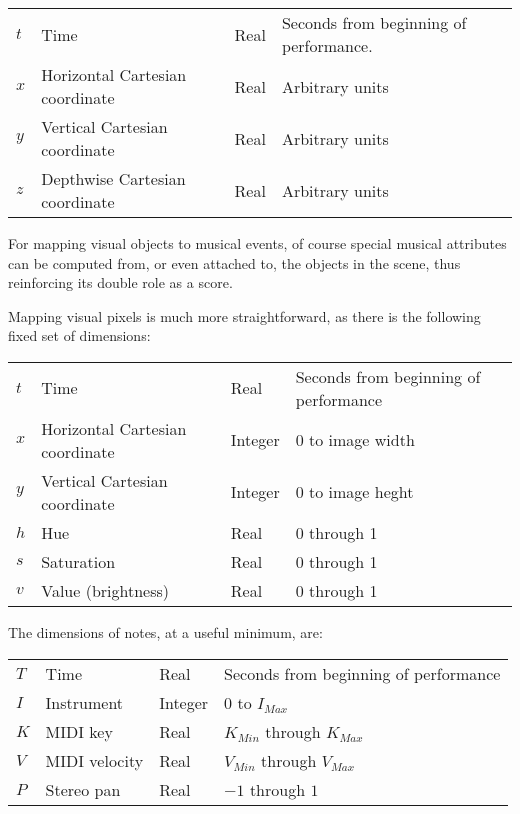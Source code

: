 \documentclass[english,11pt,letterpaper,onecolumn]{scrartcl}
\begin{document}
\begin{center}
\begin{tabular}{llll}
$t$ & Time & Real & Seconds from beginning of performance.\\
$x$ & Horizontal Cartesian coordinate & Real & Arbitrary units\\
$y$ & Vertical Cartesian coordinate & Real & Arbitrary units\\
$z$ & Depthwise Cartesian coordinate & Real & Arbitrary units\\
\end{tabular}
\end{center}

\noindent For mapping visual objects to musical events, of course special 
musical attributes can be computed from, or even attached to, the objects in 
the scene, thus reinforcing its double role as a score.

Mapping visual pixels is much more straightforward, as there is the 
following fixed set of dimensions:

\begin{center}
\begin{tabular}{llll}
$t$ & Time & Real & Seconds from beginning of performance\\
$x$ & Horizontal Cartesian coordinate & Integer & 0 to image 
width\\
$y$ & Vertical Cartesian coordinate & Integer & 0 to 
image heght\\
$h$ & Hue & Real & 0 through 1\\
$s$ & Saturation & Real & 0 through 1\\
$v$ & Value (brightness) & Real & 0 through 1\\
\end{tabular}
\end{center}

\noindent The dimensions of notes, at a useful minimum, are:

\begin{center}
\begin{tabular}{llll}
$T$ & Time & Real & Seconds from beginning of performance\\
$I$ & Instrument & Integer & 0 to $I_{Max}$\\
$K$ & MIDI key & Real & $K_{Min}$ through $K_{Max}$\\
$V$ & MIDI velocity & Real & $V_{Min}$ through $V_{Max}$\\
$P$ & Stereo pan & Real & $-1$ through $1$\\
\end{tabular}
\end{center}
\end{document}
